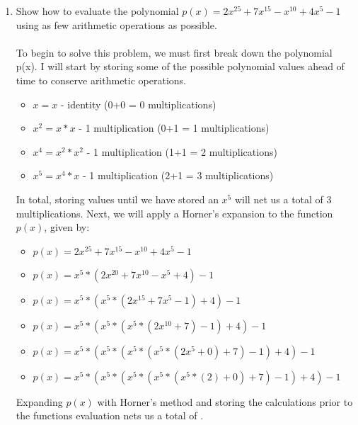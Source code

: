 \documentclass[12pt]{article}
\begin{document}
\begin{enumerate}

	\item Show how to evaluate the polynomial \(p(x) = 2x^{25} + 7x^{15} - x^{10} + 4x^{5} - 1\) using as few arithmetic operations as possible. \\ \\
	To begin to solve this problem, we must first break down the polynomial p(x). I will start by storing some of the possible polynomial values ahead of time to conserve arithmetic operations.
	
	\begin{itemize}
		\item[] \(x = x\) \tabto{6cm} - identity \tabto{10cm} (0+0 = 0 multiplications)
		\item[] \(x^2 = x * x\) \tabto{6cm} - 1 multiplication  \tabto{10cm} (0+1 = 1 multiplications)
		\item[] \(x^4 = x^2 * x^2\) \tabto{6cm} - 1 multiplication \tabto{10cm} (1+1 = 2 multiplications)
		\item[] \(x^5 = x^4 * x\) \tabto{6cm} - 1 multiplication \tabto{10cm} (2+1 = 3 multiplications)
	\end{itemize}
	
In total, storing values until we have stored an \(x^5\) will net us a total of 3 multiplications. Next, we will apply a Horner's expansion to the function \(p(x)\), given by:	
	
	\begin{itemize}
		\item[] \(p(x) = 2x^{25} + 7x^{15} - x^{10} + 4x^{5} - 1\)
		\item[] \(p(x) = x^5 * (2x^{20}  +7x^{10} - x^5 + 4) - 1\)
		\item[] \(p(x) = x^5 * ( x^5 * ( 2x^{15} + 7x^5 - 1) + 4) -1\)
		\item[] \(p(x) = x^5 * (x^5 * (x^5 * (2x^{10} + 7 ) - 1 ) +4 ) - 1\)
		\item[] \(p(x) = x^5 * (x^5 * (x^5 *( x^5 *(2x^5 + 0) +7) -1)+4)-1\)
		\item[] \(p(x) = x^5 * (x^5 * (x^5 *( x^5 *(x^5 * (2) + 0) +7) -1)+4)-1\)
	\end{itemize}
		
Expanding \(p(x)\) with Horner's method and storing the calculations prior to the functions evaluation nets us a total of .\\ \\ \\


\end{enumerate}
\end{document}
